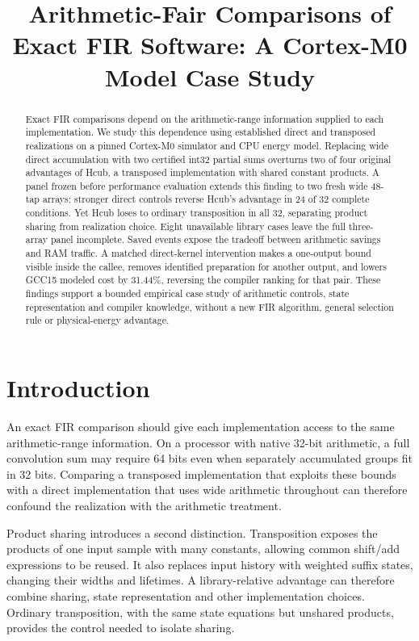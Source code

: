 \documentclass[conference]{IEEEtran}
\title{Arithmetic-Fair Comparisons of Exact FIR Software: A Cortex-M0 Model Case Study}
\author{\IEEEauthorblockN{Harsh Upadhyay}
\IEEEauthorblockA{Reg No.: 240911650\\Roll No.: 57}
\and
\IEEEauthorblockN{Aishwarya Singh}
\IEEEauthorblockA{Reg No.: 240911232\\Roll No.: 24}
\and
\IEEEauthorblockN{Aryan Devpura}
\IEEEauthorblockA{Reg No.: 240911108\\Roll No.: 12}}
\begin{document}
\pagestyle{plain}
\maketitle
\thispagestyle{plain}
\begin{abstract}

Exact FIR comparisons depend on the arithmetic-range information
supplied to each implementation. We study this dependence using
established direct and transposed realizations on a pinned Cortex-M0
simulator and CPU energy model. Replacing wide direct accumulation with
two certified int32 partial sums overturns two of four original
advantages of Hcub, a transposed implementation with shared constant
products. A panel frozen before performance evaluation extends this
finding to two fresh wide 48-tap arrays: stronger direct controls
reverse Hcub's advantage in 24 of 32 complete conditions. Yet Hcub loses
to ordinary transposition in all 32, separating product sharing from
realization choice. Eight unavailable library cases leave the full
three-array panel incomplete. Saved events expose the tradeoff between
arithmetic savings and RAM traffic. A matched direct-kernel intervention
makes a one-output bound visible inside the callee, removes identified
preparation for another output, and lowers GCC15 modeled cost by
31.44\%, reversing the compiler ranking for that pair. These findings
support a bounded empirical case study of arithmetic controls, state
representation and compiler knowledge, without a new FIR algorithm,
general selection rule or physical-energy advantage.

\end{abstract}

\section{Introduction}\label{introduction}

An exact FIR comparison should give each implementation access to the
same arithmetic-range information. On a processor with native 32-bit
arithmetic, a full convolution sum may require 64 bits even when
separately accumulated groups fit in 32 bits. Comparing a transposed
implementation that exploits these bounds with a direct implementation
that uses wide arithmetic throughout can therefore confound the
realization with the arithmetic treatment.

Product sharing introduces a second distinction. Transposition exposes
the products of one input sample with many constants, allowing common
shift/add expressions to be reused. It also replaces input history with
weighted suffix states, changing their widths and lifetimes. A
library-relative advantage can therefore combine sharing, state
representation and other implementation choices. Ordinary transposition,
with the same state equations but unshared products, provides the
control needed to isolate sharing.
\end{document}
